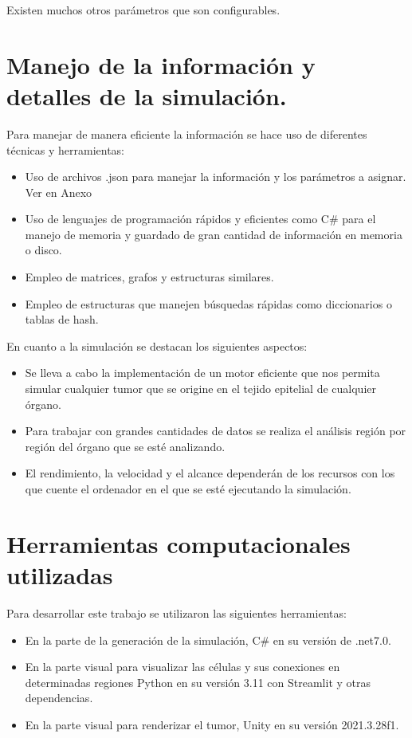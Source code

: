 Existen muchos otros par\'ametros que son configurables.\\

\section{Manejo de la informaci\'on y detalles de la simulaci\'on.}
Para manejar de manera eficiente la informaci\'on se hace uso de diferentes t\'ecnicas y herramientas:
\begin{itemize}
    \item Uso de archivos .json para manejar la información y los parámetros a asignar. Ver en Anexo %
    \item Uso de lenguajes de programación rápidos y eficientes como C\# para el manejo de memoria y guardado de gran cantidad de información en memoria o disco.
    \item Empleo de matrices, grafos y estructuras similares.
    \item Empleo de estructuras que manejen búsquedas rápidas como diccionarios o tablas de hash.
\end{itemize}

En cuanto a la simulaci\'on se destacan los siguientes aspectos:
\begin{itemize}
    \item Se lleva a cabo la implementación de un motor eficiente que nos permita simular cualquier tumor que se origine en el tejido epitelial de cualquier órgano.
    \item Para trabajar con grandes cantidades de datos se realiza el análisis región por región del órgano que se esté analizando.
    \item El rendimiento, la velocidad y el alcance dependerán de los recursos con los que cuente el ordenador en el que se esté ejecutando la simulación.
\end{itemize}

\section{Herramientas computacionales utilizadas}

Para desarrollar este trabajo se utilizaron las siguientes herramientas:
\begin{itemize}
    \item En la parte de la generaci\'on de la simulaci\'on, C\# en su versi\'on de .net7.0.
    \item En la parte visual para visualizar las c\'elulas y sus conexiones en determinadas regiones Python en su versi\'on 3.11 con Streamlit y otras dependencias.
    \item En la parte visual para renderizar el tumor, Unity en su versi\'on 2021.3.28f1.
\end{itemize}